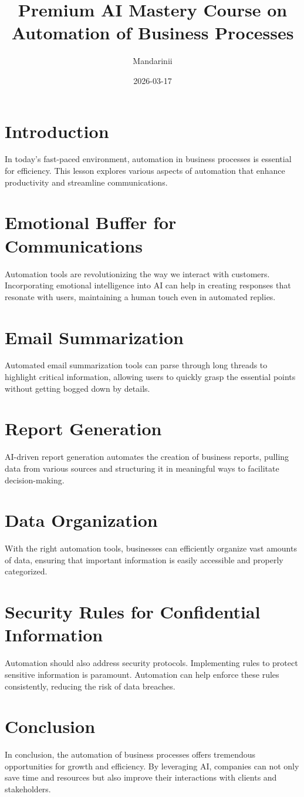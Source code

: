 \documentclass{article}
\title{Premium AI Mastery Course on Automation of Business Processes}
\author{Mandarinii}
\date{2026-03-17}
\begin{document}
\maketitle

\section{Introduction}
In today’s fast-paced environment, automation in business processes is essential for efficiency. This lesson explores various aspects of automation that enhance productivity and streamline communications.

\section{Emotional Buffer for Communications}
Automation tools are revolutionizing the way we interact with customers. Incorporating emotional intelligence into AI can help in creating responses that resonate with users, maintaining a human touch even in automated replies.

\section{Email Summarization}
Automated email summarization tools can parse through long threads to highlight critical information, allowing users to quickly grasp the essential points without getting bogged down by details.

\section{Report Generation}
AI-driven report generation automates the creation of business reports, pulling data from various sources and structuring it in meaningful ways to facilitate decision-making.

\section{Data Organization}
With the right automation tools, businesses can efficiently organize vast amounts of data, ensuring that important information is easily accessible and properly categorized.

\section{Security Rules for Confidential Information}
Automation should also address security protocols. Implementing rules to protect sensitive information is paramount. Automation can help enforce these rules consistently, reducing the risk of data breaches.

\section{Conclusion}
In conclusion, the automation of business processes offers tremendous opportunities for growth and efficiency. By leveraging AI, companies can not only save time and resources but also improve their interactions with clients and stakeholders.
\end{document}
